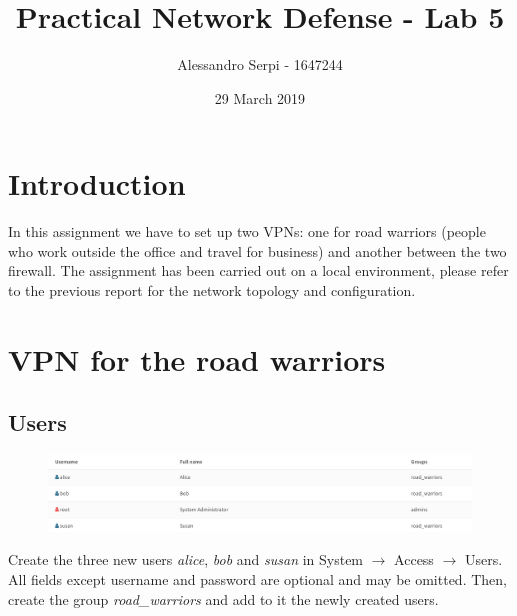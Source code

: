\documentclass{homework}
\title{Practical Network Defense - Lab 5}
\author{Alessandro Serpi - 1647244}
\date{29 March 2019}
\begin{document}
    \maketitle
    \tableofcontents
    
    
    \pagebreak
    \section{Introduction}
    In this assignment we have to set up two VPNs: one for road warriors (people who work outside the office and travel for business) and another between the two firewall.
    The assignment has been carried out on a local environment, please refer to the previous report for the network topology and configuration.
    
    \section{VPN for the road warriors}
    \subsection{Users}
    \vspace{-10pt}
    \begin{figure}[H]
        \centering
        \includegraphics[width=\linewidth]{openvpn/users}
        \label{fig:users}
    \end{figure}
    \vspace{-20pt}
    Create the three new users \textit{alice}, \textit{bob} and \textit{susan} in System $\rightarrow$ Access $\rightarrow$ Users.
    All fields except username and password are optional and may be omitted. 
    Then, create the group \textit{road\_warriors} and add to it the newly created users.
    
\end{document}
